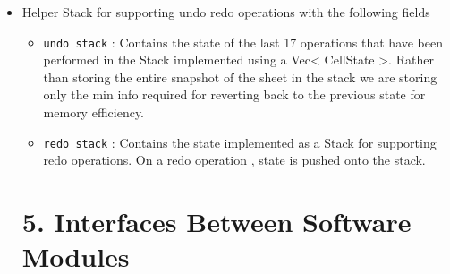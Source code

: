 \documentclass{article}
\begin{document}
\begin{itemize}
    \item {}
        Helper Stack for supporting undo redo operations with the following fields
    \begin{itemize}
        \item \texttt{undo stack} : Contains the state of the last 17 operations that have been performed in the Stack implemented using a Vec< CellState >. Rather than storing the entire snapshot of the sheet in the stack we are storing only the min info required for reverting back to the previous state for memory efficiency.
        \item \texttt{redo stack} : Contains the state implemented as a Stack for supporting redo operations. On a redo operation , state is pushed onto the stack.
    \end{itemize}
    


\section*{5. Interfaces Between Software Modules}


\end{itemize}
\end{document}
